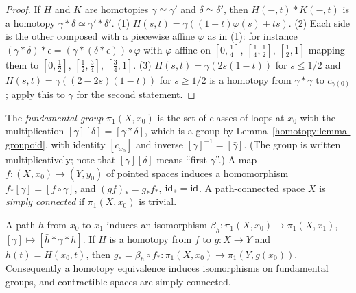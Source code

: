 \begin{proof}
If $H$ and $K$ are homotopies $\gamma \simeq \gamma'$ and $\delta \simeq \delta'$, then $H(-, t) * K(-, t)$ is a homotopy $\gamma * \delta \simeq \gamma' * \delta'$.
(1) $H(s, t) = \gamma((1 - t)\varphi(s) + ts)$. (2) Each side is the other composed with a piecewise affine $\varphi$ as in (1): for instance
$(\gamma * \delta) * \epsilon = (\gamma * (\delta * \epsilon)) \circ \varphi$ with $\varphi$ affine on $[0, \frac14]$, $[\frac14, \frac12]$, $[\frac12, 1]$
mapping them to $[0, \frac12]$, $[\frac12, \frac34]$, $[\frac34, 1]$. (3) $H(s, t) = \gamma(2s(1 - t))$ for $s \leq 1/2$ and
$H(s, t) = \gamma((2 - 2s)(1 - t))$ for $s \geq 1/2$ is a homotopy from $\gamma * \bar\gamma$ to $c_{\gamma(0)}$; apply this to $\bar\gamma$ for the second
statement.
\end{proof}

\begin{definition}\label{homotopy:definition-fundamental-group}
The \emph{fundamental group} $\pi_1(X, x_0)$ is the set of classes of loops at $x_0$ with the multiplication $[\gamma][\delta] = [\gamma * \delta]$, which is a
group by Lemma~\ref{homotopy:lemma-groupoid}, with identity $[c_{x_0}]$ and inverse $[\gamma]^{-1} = [\bar\gamma]$. (The group is written multiplicatively;
note that $[\gamma][\delta]$ means ``first $\gamma$''.) A map $f \colon (X, x_0) \to (Y, y_0)$ of pointed spaces induces a homomorphism
$f_*[\gamma] = [f \circ \gamma]$, and $(gf)_* = g_*f_*$, $\mathrm{id}_* = \mathrm{id}$. A path-connected space $X$ is \emph{simply connected} if $\pi_1(X, x_0)$ is trivial.
\end{definition}

\begin{lemma}\label{homotopy:lemma-change-basepoint}
A path $h$ from $x_0$ to $x_1$ induces an isomorphism $\beta_h \colon \pi_1(X, x_0) \to \pi_1(X, x_1)$, $[\gamma] \mapsto [\bar h * \gamma * h]$. If $H$ is a homotopy
from $f$ to $g \colon X \to Y$ and $h(t) = H(x_0, t)$, then $g_* = \beta_h \circ f_* \colon \pi_1(X, x_0) \to \pi_1(Y, g(x_0))$. Consequently a homotopy
equivalence induces isomorphisms on fundamental groups, and contractible spaces are simply connected.
\end{lemma}

